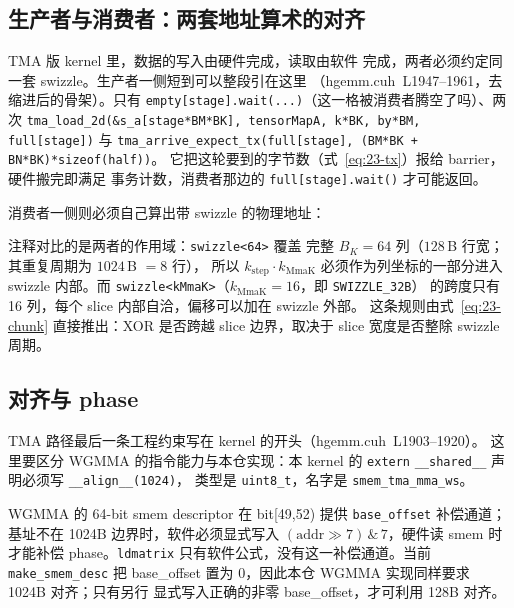 \subsection{生产者与消费者：两套地址算术的对齐}

TMA 版 kernel 里，数据的写入由硬件完成，读取由软件
完成，两者必须约定同一套 swizzle。生产者一侧短到可以整段引在这里
（hgemm.cuh~L1947--1961，去缩进后的骨架）。只有
\texttt{empty[stage].\allowbreak{}wait\allowbreak{}(.\allowbreak{}.\allowbreak{}.\allowbreak{})}（这一格被消费者腾空了吗）、两次
\texttt{tma\_\allowbreak{}load\_\allowbreak{}2d\allowbreak{}(\&s\_\allowbreak{}a[stage*BM*BK],\allowbreak{} tensor\allowbreak{}Map\allowbreak{}A,\allowbreak{} k*BK,\allowbreak{} by*BM,\allowbreak{} full[stage])}
与 \texttt{tma\_\allowbreak{}arrive\_\allowbreak{}expect\_\allowbreak{}tx\allowbreak{}(full[stage],\allowbreak{} (BM*BK + BN*BK)*sizeof\allowbreak{}(half))}。
它把这轮要到的字节数（式~\eqref{eq:23-tx}）报给 barrier，硬件搬完即满足
事务计数，消费者那边的 \texttt{full[stage].\allowbreak{}wait\allowbreak{}()} 才可能返回。

消费者一侧则必须自己算出带 swizzle 的物理地址：



注释对比的是两者的作用域：\texttt{swizzle<64>} 覆盖
完整 $B_K=64$ 列（$128$\,B 行宽；其重复周期为 $1024$\,B $=8$ 行），
所以 $k_{\text{step}}\cdot k_{\text{MmaK}}$
必须作为列坐标的一部分进入 swizzle 内部。而
\texttt{swizzle\allowbreak{}<k\allowbreak{}Mma\allowbreak{}K>}（$k_{\text{MmaK}}=16$，即 \texttt{SWIZZLE\_32B}）
的跨度只有 16 列，每个 slice 内部自洽，偏移可以加在 swizzle 外部。
这条规则由式~\eqref{eq:23-chunk} 直接推出：XOR 是否跨越
slice 边界，取决于 slice 宽度是否整除 swizzle 周期。

\subsection{对齐与 phase}

TMA 路径最后一条工程约束写在 kernel 的开头（hgemm.cuh~L1903--1920）。
这里要区分 WGMMA 的指令能力与本仓实现：本 kernel 的 \texttt{extern}
\texttt{\_\_shared\_\_} 声明必须写 \texttt{\_\allowbreak{}\_\allowbreak{}align\_\allowbreak{}\_\allowbreak{}(1024)}，
类型是 \texttt{uint8\_t}，名字是 \texttt{smem\_\allowbreak{}tma\_\allowbreak{}mma\_\allowbreak{}ws}。

WGMMA 的 64-bit smem descriptor 在 bit[49,52) 提供 \texttt{base\_offset}
补偿通道；基址不在 1024B 边界时，软件必须显式写入
$(\mathrm{addr}\gg7)\,\&\,7$，硬件读 smem 时才能补偿 phase。\texttt{ldmatrix}
只有软件公式，没有这一补偿通道。当前 \texttt{make\_\allowbreak{}smem\_\allowbreak{}desc}
把 base\_offset 置为 0，因此本仓 WGMMA 实现同样要求 1024B 对齐；只有另行
显式写入正确的非零 base\_offset，才可利用 128B 对齐。

